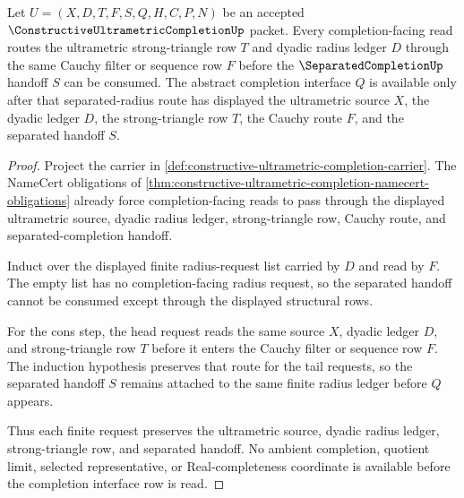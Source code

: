 \begin{theorem}
\label{thm:constructive-ultrametric-completion-separated-radius-route}
Let $U=(X,D,T,F,S,Q,H,C,P,N)$ be an accepted $\ConstructiveUltrametricCompletionUp$ packet. Every completion-facing read routes the ultrametric strong-triangle row $T$ and dyadic radius ledger $D$ through the same Cauchy filter or sequence row $F$ before the $\SeparatedCompletionUp$ handoff $S$ can be consumed. The abstract completion interface $Q$ is available only after that separated-radius route has displayed the ultrametric source $X$, the dyadic ledger $D$, the strong-triangle row $T$, the Cauchy route $F$, and the separated handoff $S$.
\end{theorem}
\begin{proof}
Project the carrier in \autoref{def:constructive-ultrametric-completion-carrier}. The NameCert obligations of \autoref{thm:constructive-ultrametric-completion-namecert-obligations} already force completion-facing reads to pass through the displayed ultrametric source, dyadic radius ledger, strong-triangle row, Cauchy route, and separated-completion handoff.

Induct over the displayed finite radius-request list carried by $D$ and read by $F$. The empty list has no completion-facing radius request, so the separated handoff cannot be consumed except through the displayed structural rows.

For the cons step, the head request reads the same source $X$, dyadic ledger $D$, and strong-triangle row $T$ before it enters the Cauchy filter or sequence row $F$. The induction hypothesis preserves that route for the tail requests, so the separated handoff $S$ remains attached to the same finite radius ledger before $Q$ appears.

Thus each finite request preserves the ultrametric source, dyadic radius ledger, strong-triangle row, and separated handoff. No ambient completion, quotient limit, selected representative, or Real-completeness coordinate is available before the completion interface row is read.
\end{proof}


